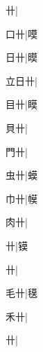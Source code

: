 \begin{multicols}{2}
{{卄}|{}\par
{\cjk{}{\cnsym{}　}口卄}|{\cjk{}嗼}\par
{\cjk{}{\cnsym{}　}日卄}|{\cjk{}暯}\par
{\cjk{}立日卄}|{}\par
{\cjk{}{\cnsym{}　}目卄}|{\cjk{}瞙}\par
{\cjk{}{\cnsym{}　}貝卄}|{}\par
{\cjk{}{\cnsym{}　}門卄}|{}\par
{\cjk{}{\cnsym{}　}虫卄}|{\cjk{}蟆}\par
{\cjk{}{\cnsym{}　}巾卄}|{\cjk{}幙}\par
{\cjk{}{\cnsym{}　}肉卄}|{}\par
{卄}|{\cjk{}镆}\par
{卄}|{}\par
{\cjk{}{\cnsym{}　}毛卄}|{\cjk{}氁}\par
{\cjk{}{\cnsym{}　}禾卄}|{}\par
{卄}|{}\par
}
\end{multicols}
